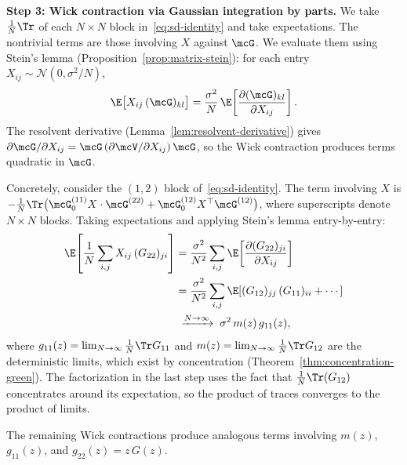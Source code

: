 \medskip
\noindent\textbf{Step 3: Wick contraction via Gaussian integration by parts.}
We take $\frac{1}{N}\Tr$ of each $N \times N$ block in~\eqref{eq:sd-identity} and take expectations. The nontrivial terms are those involving $X$ against $\mcG$. We evaluate them using Stein's lemma (Proposition~\ref{prop:matrix-stein}): for each entry $X_{ij} \sim \mathcal{N}(0, \sigma^2/N)$,
\[
\E\bigl[X_{ij}\,(\mcG)_{kl}\bigr] = \frac{\sigma^2}{N}\,\E\!\left[\frac{\partial (\mcG)_{kl}}{\partial X_{ij}}\right].
\]
The resolvent derivative (Lemma~\ref{lem:resolvent-derivative}) gives $\partial \mcG / \partial X_{ij} = \mcG \,(\partial \mcV / \partial X_{ij})\, \mcG$, so the Wick contraction produces terms quadratic in $\mcG$.

Concretely, consider the $(1,2)$ block of~\eqref{eq:sd-identity}. The term involving $X$ is $-\frac{1}{N}\Tr\bigl(\mcG_0^{(11)} X \cdot \mcG^{(22)} + \mcG_0^{(12)} X^\top \mcG^{(12)}\bigr)$, where superscripts denote $N \times N$ blocks. Taking expectations and applying Stein's lemma entry-by-entry:
\begin{align}
\E\!\left[\frac{1}{N}\sum_{i,j} X_{ij}\,(G_{22})_{ji}\right]
&= \frac{\sigma^2}{N^2}\sum_{i,j}\E\!\left[\frac{\partial (G_{22})_{ji}}{\partial X_{ij}}\right] \notag\\
&= \frac{\sigma^2}{N^2}\sum_{i,j}\E\!\left[(G_{12})_{jj}\,(G_{11})_{ii} + \cdots\right] \notag\\
&\;\xrightarrow{N \to \infty}\; \sigma^2\,m(z)\,g_{11}(z), \label{eq:wick-result}
\end{align}
where $g_{11}(z) = \lim_{N\to\infty}\frac{1}{N}\Tr G_{11}$ and $m(z) = \lim_{N\to\infty}\frac{1}{N}\Tr G_{12}$ are the deterministic limits, which exist by concentration (Theorem~\ref{thm:concentration-green}). The factorization in the last step uses the fact that $\frac{1}{N}\Tr(G_{12})$ concentrates around its expectation, so the product of traces converges to the product of limits.

The remaining Wick contractions produce analogous terms involving $m(z)$, $g_{11}(z)$, and $g_{22}(z) = z\,G(z)$.

